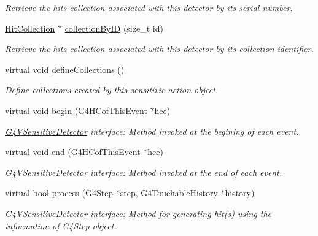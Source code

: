 \begin{DoxyCompactItemize}
\begin{DoxyCompactList}\small\item\em Retrieve the hits collection associated with this detector by its serial number. \end{DoxyCompactList}\item 
\hyperlink{class_d_d4hep_1_1_simulation_1_1_geant4_sensitive_a160ee45c4477c7165b1d56d377e5582f}{Hit\+Collection} $\ast$ \hyperlink{class_d_d4hep_1_1_simulation_1_1_geant4_sensitive_ad45d2c806dd89d1434ba8eec35b87843}{collection\+By\+ID} (size\+\_\+t id)
\begin{DoxyCompactList}\small\item\em Retrieve the hits collection associated with this detector by its collection identifier. \end{DoxyCompactList}\item 
virtual void \hyperlink{class_d_d4hep_1_1_simulation_1_1_geant4_sensitive_a88c872b79e49e399c8ee282960c2d77d}{define\+Collections} ()
\begin{DoxyCompactList}\small\item\em Define collections created by this sensitivie action object. \end{DoxyCompactList}\item 
virtual void \hyperlink{class_d_d4hep_1_1_simulation_1_1_geant4_sensitive_a2967b095e6c32ae82f68a8b25a086c86}{begin} (G4\+H\+Cof\+This\+Event $\ast$hce)
\begin{DoxyCompactList}\small\item\em \hyperlink{class_g4_v_sensitive_detector}{G4\+V\+Sensitive\+Detector} interface\+: Method invoked at the begining of each event. \end{DoxyCompactList}\item 
virtual void \hyperlink{class_d_d4hep_1_1_simulation_1_1_geant4_sensitive_abcce05101539a9941c06aada4625a608}{end} (G4\+H\+Cof\+This\+Event $\ast$hce)
\begin{DoxyCompactList}\small\item\em \hyperlink{class_g4_v_sensitive_detector}{G4\+V\+Sensitive\+Detector} interface\+: Method invoked at the end of each event. \end{DoxyCompactList}\item 
virtual bool \hyperlink{class_d_d4hep_1_1_simulation_1_1_geant4_sensitive_a9a9463a6c29a66dad43a52ffc9f7838d}{process} (G4\+Step $\ast$step, G4\+Touchable\+History $\ast$history)
\begin{DoxyCompactList}\small\item\em \hyperlink{class_g4_v_sensitive_detector}{G4\+V\+Sensitive\+Detector} interface\+: Method for generating hit(s) using the information of G4\+Step object. \end{DoxyCompactList}\item 

\end{DoxyCompactItemize}

